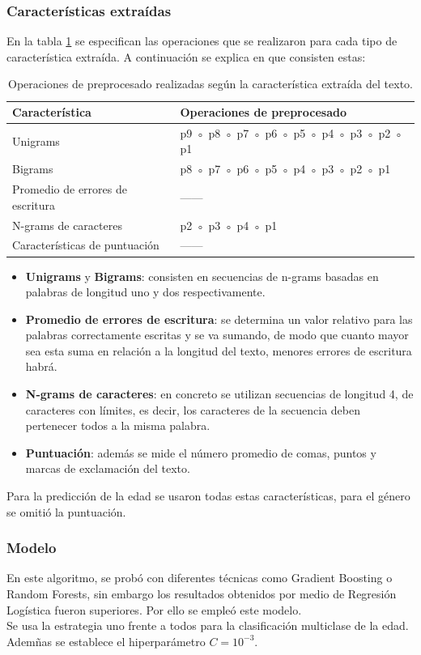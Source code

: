 \subsubsection{Características extraídas}
En la tabla \ref{tab:preprocesado} se especifican las operaciones que se realizaron para cada tipo de característica extraída. A continuación se explica en que consisten estas:
\begin{table}[hp!]
    \centering
    \begin{tabular}{|l|l|}
        \rowcolor{udcpink!25}
        \hline
        \textbf{Característica} & \textbf{Operaciones de preprocesado} \\\hline
        Unigrams & p9 ◦ p8 ◦ p7 ◦ p6 ◦ p5 ◦ p4 ◦ p3 ◦ p2 ◦ p1 \\
        Bigrams & p8 ◦ p7 ◦ p6 ◦ p5 ◦ p4 ◦ p3 ◦ p2 ◦ p1 \\
        Promedio de errores de escritura & —— \\
        N-grams de caracteres & p2 ◦ p3 ◦ p4 ◦ p1 \\
        Características de puntuación & —— \\ \hline
    \end{tabular}%
    \caption{Operaciones de preprocesado realizadas según la característica extraída del texto.}
    \label{tab:preprocesado}
\end{table}
\begin{itemize}
    \item \textbf{Unigrams} y \textbf{Bigrams}: consisten en secuencias de n-grams basadas en palabras de longitud uno y dos respectivamente.
    \item \textbf{Promedio de errores de escritura}: se determina un valor relativo para las palabras correctamente escritas y se va sumando, de modo que cuanto mayor sea esta suma en relación a la longitud del texto, menores errores de escritura habrá.
    \item \textbf{N-grams de caracteres}: en concreto se utilizan secuencias de longitud 4, de caracteres con límites, es decir, los caracteres de la secuencia deben pertenecer todos a la misma palabra.
    \item \textbf{Puntuación}: además se mide el número promedio de comas, puntos y marcas de exclamación del texto.
\end{itemize}
Para la predicción de la edad se usaron todas estas características, para el género se omitió la puntuación.

\subsubsection{Modelo}
En este algoritmo, se probó con diferentes técnicas como Gradient Boosting o Random Forests, sin embargo los resultados obtenidos por medio de Regresión Logística fueron superiores. Por ello se empleó este modelo.\\
Se usa la estrategia uno frente a todos para la clasificación multiclase de la edad. Ademñas se establece el hiperparámetro $C=10^{-3}$.
